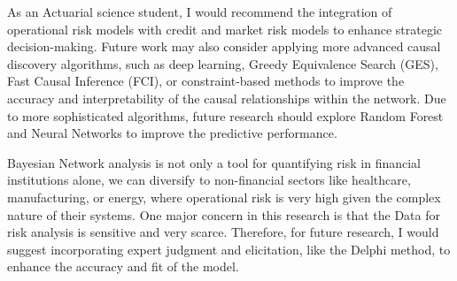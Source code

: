As an Actuarial science student, I would recommend the integration of operational risk models with credit and market risk models to enhance strategic decision-making. Future work may also consider applying more advanced causal discovery algorithms, such as deep learning, Greedy Equivalence Search (GES), Fast Causal Inference (FCI), or constraint-based methods to improve the accuracy and interpretability of the causal relationships within the network. Due to more sophisticated algorithms, future research should explore Random Forest and Neural Networks to improve the predictive performance. 

Bayesian Network analysis is not only a tool for quantifying risk in financial institutions alone, we can diversify to non-financial sectors like healthcare, manufacturing, or energy, where operational risk is very high given the complex nature of their systems. One major concern in this research is that the Data for risk analysis is sensitive and very scarce. Therefore, for future research, I would suggest incorporating expert judgment and elicitation, like the Delphi method, to enhance the accuracy and fit of the model.


